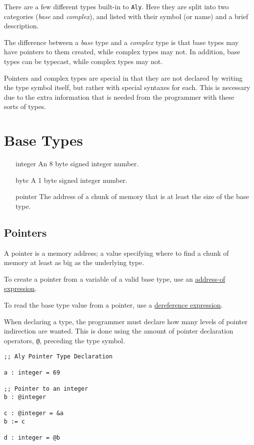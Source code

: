 \documentclass[12pt]{report}
\begin{document}
There are a few different types built-in to \verb|Aly|. Here they are split into two categories (\emph{base} and \emph{complex}), and listed with their symbol (or name) and a brief description.

The difference between a \emph{base} type and a \emph{complex} type is that base types may have pointers to them created, while complex types may not. In addition, base types can be typecast, while complex types may not.

Pointers and complex types are special in that they are not declared by writing the type symbol itself, but rather with special syntaxes for each. This is necessary due to the extra information that is needed from the programmer with these sorts of types.

\section{Base Types}
\label{subsec:types-base-types}

\begin{itemize}
\item[integer]  An 8 byte signed integer number.
\item[byte]     A 1 byte signed integer number.
\item[pointer]  The address of a chunk of memory that is at least the size of the base type.
\end{itemize}

\subsection*{Pointers}

A pointer is a memory address; a value specifying where to find a chunk of memory at least as big as the underlying type.

To create a pointer from a variable of a valid base type, use an \hyperref[subsec:expressions-address-of]{address-of expression}.

To read the base type value from a pointer, use a \hyperref[subsec:expressions-dereference]{dereference expression}.

When declaring a type, the programmer must declare how many levels of pointer indirection are wanted. This is done using the amount of pointer declaration operators, \verb|@|, preceding the type symbol.

\begin{Verbatim}[samepage=true]
;; Aly Pointer Type Declaration

a : integer = 69

;; Pointer to an integer
b : @integer

c : @integer = &a
b := c

d : integer = @b
\end{Verbatim}
\end{document}
